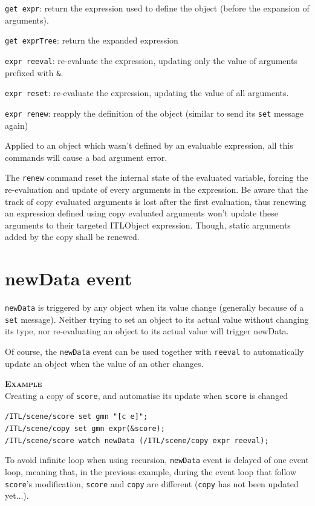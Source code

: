 \documentclass[a4paper,twoside]{report}
\newcommand{\sublevel}[1]	{\section{#1}}
\newcommand{\OSC}[1]		{\texttt{#1}}
\newcommand{\example}		{\textbf{\hspace{-1.5cm}\textbf{\textsc{Example }}}}
\newcommand{\lowTilde} 		{\texttildelow}
\let\olditemize\itemize
\let\oldenditemize\enditemize
\renewenvironment{itemize} 	{\olditemize \setlength{\itemsep}{1mm}}{\oldenditemize}
\newcommand{\sample}	[1]			{\vspace{-2mm}\begin{center}\colorbox{mygrey}{
								\begin{minipage}[t]{0.9\columnwidth} 
								{\small \texttt{#1}}
								\end{minipage}}\end{center}}
\begin{document}
\begin{itemize}
\item \OSC{get expr}: return the expression used to define the object (before the expansion of \OSC{\lowTilde} arguments).
\item \OSC{get exprTree}: return the expanded expression

\item \OSC{expr reeval}: re-evaluate the expression, updating only the value of arguments prefixed with \OSC{\&}.
\item \OSC{expr reset}: re-evaluate the expression, updating the value of all arguments.
\item \OSC{expr renew}: reapply the definition of the object (similar to send its \OSC{set} message again)
\end{itemize}

Applied to an object which wasn't defined by an evaluable expression, all this commands will cause a bad argument error.
\smallbreak

The \OSC{renew} command reset the internal state of the evaluated variable, forcing the re-evaluation and update of every arguments in the expression. Be aware that the track of copy evaluated arguments is lost after the first evaluation, thus renewing an expression defined using copy evaluated arguments won't update these arguments to their targeted ITLObject expression. Though, static arguments added by the copy shall be renewed.


\sublevel{newData event}

\OSC{newData} is triggered by any object when its value change (generally because of a \OSC{set} message). Neither trying to set an object to its actual value without changing its type, nor re-evaluating an object to its actual value will trigger newData.

Of course, the \OSC{newData} event can be used together with \OSC{reeval} to automatically update an object when the value of an other changes.

\example\\
Creating a copy of \OSC{score}, and automatise its update when \OSC{score} is changed
\sample{/ITL/scene/score set gmn "[c e]";\\
/ITL/scene/copy set gmn expr(\&score);\\
/ITL/scene/score watch newData (/ITL/scene/copy expr reeval);
}

To avoid infinite loop when using recursion, \OSC{newData} event is delayed of one event loop, meaning that, in the previous example, during the event loop that follow \OSC{score}'s modification, \OSC{score} and \OSC{copy} are different (\OSC{copy} has not been updated yet...).
\end{document}

